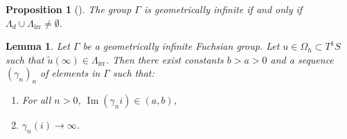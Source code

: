 \documentclass[11pt]{amsart}
\newtheorem{lem}{Lemma}[section]
\newtheorem{prp}{Proposition}
\begin{document}
\begin{prp}[\cite{GayeLo2017}]
The group \( \Gamma \) is geometrically infinite if and only if \( \Lambda_d \cup \Lambda_{\mathrm{irr}} \neq \emptyset \).
\end{prp}
\begin{lem}\label{A}
Let \( \Gamma \) be a geometrically infinite Fuchsian group.  
Let \( u \in \Omega_h \subset T^1S \) such that \( \widetilde{u}(\infty) \in \Lambda_{\mathrm{irr}} \).  
Then there exist constants \( b > a > 0 \) and a sequence \( (\gamma_n)_n \) of elements in \( \Gamma \) such that:
\begin{enumerate}
    \item For all \( n > 0 \), \( \operatorname{Im}(\gamma_n i) \in (a, b) \),
    \item \( \gamma_n(i) \to \infty \).
\end{enumerate}
\end{lem}
\end{document}
